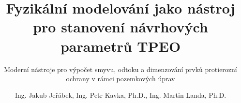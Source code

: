\documentclass[9pt,aspectratio=43]{beamer}
\begin{document}
    \title{Fyzikální modelování jako nástroj pro stanovení návrhových parametrů TPEO\\[1ex]}  
    \subtitle{Moderní nástroje pro výpočet smyvu, odtoku a dimenzování prvků protierozní ochrany v rámci pozemkových úprav}
    \author{Ing. Jakub Jeřábek, Ing. Petr Kavka, Ph.D., Ing. Martin Landa, Ph.D.}

    \begin{frame}[plain]
        \titlepage
    \end{frame} 
    
    
    
    
    
    
    
\end{document}
